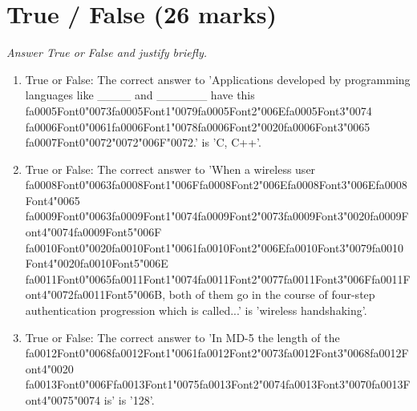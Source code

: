 \documentclass[12pt]{article}
\begin{document}
\section*{True / False (26 marks)}
\textit{Answer True or False and justify briefly.}
\begin{enumerate}[label=\arabic*.]
\item True or False: The correct answer to 'Applications developed by programming languages like \_\_\_\_ and \_\_\_\_\_\_ have this {\csname fa0005Font0\endcsname\char"0073}{\csname fa0005Font1\endcsname\char"0079}{\csname fa0005Font2\endcsname\char"006E}{\csname fa0005Font3\endcsname\char"0074} {\csname fa0006Font0\endcsname\char"0061}{\csname fa0006Font1\endcsname\char"0078}{\csname fa0006Font2\endcsname\char"0020}{\csname fa0006Font3\endcsname\char"0065} {\csname fa0007Font0\endcsname\char"0072}{\char"0072}{\char"006F}{\char"0072}.' is 'C, C++'.
\item True or False: The correct answer to 'When a wireless user {\csname fa0008Font0\endcsname\char"0063}{\csname fa0008Font1\endcsname\char"006F}{\csname fa0008Font2\endcsname\char"006E}{\csname fa0008Font3\endcsname\char"006E}{\csname fa0008Font4\endcsname\char"0065} {\csname fa0009Font0\endcsname\char"0063}{\csname fa0009Font1\endcsname\char"0074}{\csname fa0009Font2\endcsname\char"0073}{\csname fa0009Font3\endcsname\char"0020}{\csname fa0009Font4\endcsname\char"0074}{\csname fa0009Font5\endcsname\char"006F} {\csname fa0010Font0\endcsname\char"0020}{\csname fa0010Font1\endcsname\char"0061}{\csname fa0010Font2\endcsname\char"006E}{\csname fa0010Font3\endcsname\char"0079}{\csname fa0010Font4\endcsname\char"0020}{\csname fa0010Font5\endcsname\char"006E} {\csname fa0011Font0\endcsname\char"0065}{\csname fa0011Font1\endcsname\char"0074}{\csname fa0011Font2\endcsname\char"0077}{\csname fa0011Font3\endcsname\char"006F}{\csname fa0011Font4\endcsname\char"0072}{\csname fa0011Font5\endcsname\char"006B}, both of them go in the course of four-step authentication progression which is called...' is 'wireless handshaking'.
\item True or False: The correct answer to 'In MD-5 the length of the {\csname fa0012Font0\endcsname\char"0068}{\csname fa0012Font1\endcsname\char"0061}{\csname fa0012Font2\endcsname\char"0073}{\csname fa0012Font3\endcsname\char"0068}{\csname fa0012Font4\endcsname\char"0020} {\csname fa0013Font0\endcsname\char"006F}{\csname fa0013Font1\endcsname\char"0075}{\csname fa0013Font2\endcsname\char"0074}{\csname fa0013Font3\endcsname\char"0070}{\csname fa0013Font4\endcsname\char"0075}{\char"0074} is' is '128'.

\end{enumerate}
\end{document}
